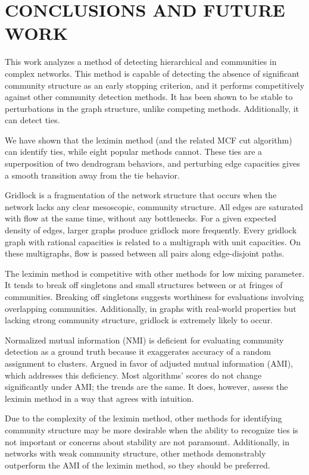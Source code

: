 \chapter{CONCLUSIONS AND FUTURE WORK} \label{ch:conclusion}%


This work analyzes a method of detecting hierarchical and communities in complex networks. This method is capable of detecting the absence of significant community structure as an early stopping criterion, and it performs competitively against other community detection methods. It has been shown to be stable to perturbations in the graph structure, unlike competing methods. Additionally, it can detect ties.

We have shown that the leximin method (and the related MCF cut algorithm) can identify ties, while eight popular methods cannot. These ties are a superposition of two dendrogram behaviors, and perturbing edge capacities gives a smooth transition away from the tie behavior.

Gridlock is a fragmentation of the network structure that occurs when the network lacks any clear mesoscopic, community structure. All edges are saturated with flow at the same time, without any bottlenecks. For a given expected density of edges, larger graphs produce gridlock more frequently. Every gridlock graph with rational capacities is related to a multigraph with unit capacities. On these multigraphs, flow is passed between all pairs along edge-disjoint paths.

The leximin method is competitive with other methods for low mixing parameter. It tends to break off singletons and small structures between or at fringes of communities. Breaking off singletons suggests worthiness for evaluations involving overlapping communities. Additionally, in graphs with real-world properties but lacking strong community structure, gridlock is extremely likely to occur.

Normalized mutual information (NMI) is deficient for evaluating community detection as a ground truth because it exaggerates accuracy of a random assignment to clusters. Argued in favor of adjusted mutual information (AMI), which addresses this deficiency. Most algorithms' scores do not change significantly under AMI; the trends are the same. It does, however, assess the leximin method in a way that agrees with intuition.

Due to the complexity of the leximin method, other methods for identifying community structure may be more desirable when the ability to recognize ties is not important or concerns about stability are not paramount. Additionally, in networks with weak community structure, other methods demonstrably outperform the AMI of the leximin method, so they should be preferred.

